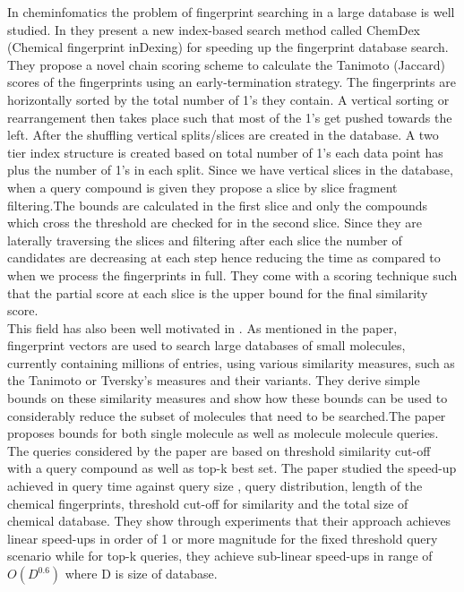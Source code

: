 
In cheminfomatics the problem of fingerprint searching in a large database is well studied. In \citet*{aung2010indexing} they present a new index-based search method called ChemDex (Chemical fingerprint inDexing) for speeding up the fingerprint database search. They propose a novel chain scoring scheme to calculate the Tanimoto (Jaccard) scores of the fingerprints using an early-termination strategy. The fingerprints are horizontally sorted by the total number of 1's they contain. A vertical sorting or rearrangement then takes place such that most of the 1's get pushed towards the left. After the shuffling vertical splits/slices are created in the database. A two tier index structure is created based on total number of 1's each data point has plus the number of 1's in each split. Since we have vertical slices in the database, when a query compound is given they propose a slice by slice fragment filtering.The bounds are calculated in the first slice and only the compounds which cross the threshold are checked for in the second slice. Since they are laterally traversing the slices and filtering after each slice the number of candidates are decreasing at each step hence reducing the time as compared to when we process the fingerprints in full. They come with a scoring technique such that the partial score at each slice is the upper bound for the final similarity score.\\

This field has also been well motivated in \citet*{swamidass2007bounds}. As mentioned in the paper, fingerprint vectors are used to search large databases of small molecules, currently containing millions of entries, using various similarity measures, such as the Tanimoto or Tversky's measures and their variants. They derive simple bounds on these similarity measures and show how these bounds can be used to considerably reduce the subset of molecules that need to be searched.The paper proposes bounds for both single molecule as well as molecule molecule queries. The queries considered by the paper are based on threshold similarity cut-off with a query compound as well as top-k best set. The paper studied the speed-up achieved in query time against query size , query distribution, length of the chemical fingerprints, threshold cut-off for similarity and the total size of chemical database. They show through experiments that their approach achieves linear speed-ups in order of 1 or more magnitude for the fixed threshold query scenario while for top-k queries, they achieve sub-linear speed-ups in range of $O(D^{0.6})$ where D is size of database.\\


